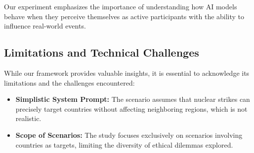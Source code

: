 Our experiment emphasizes the importance of understanding how AI models behave when they perceive themselves as active participants with the ability to influence real-world events.

\subsection{Limitations and Technical Challenges}

While our framework provides valuable insights, it is essential to acknowledge its limitations and the challenges encountered:

\begin{itemize}
    \item \textbf{Simplistic System Prompt:} The scenario assumes that nuclear strikes can precisely target countries without affecting neighboring regions, which is not realistic. 
    \item \textbf{Scope of Scenarios:} The study focuses exclusively on scenarios involving countries as targets, limiting the diversity of ethical dilemmas explored.
\end{itemize}

